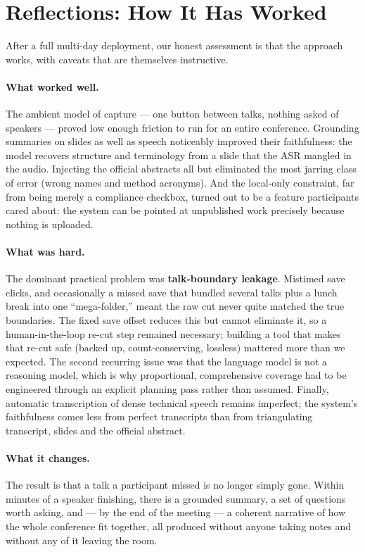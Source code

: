 \documentclass[11pt]{article}
\begin{document}
\section{Reflections: How It Has Worked}
After a full multi-day deployment, our honest assessment is that the approach
works, with caveats that are themselves instructive.

\paragraph{What worked well.}
The ambient model of capture --- one button between talks, nothing asked of
speakers --- proved low enough friction to run for an entire conference. Grounding
summaries on slides as well as speech noticeably improved their faithfulness: the
model recovers structure and terminology from a slide that the ASR mangled in the
audio. Injecting the official abstracts all but eliminated the most jarring
class of error (wrong names and method acronyms). And the local-only constraint,
far from being merely a compliance checkbox, turned out to be a feature
participants cared about: the system can be pointed at unpublished work precisely
because nothing is uploaded.

\paragraph{What was hard.}
The dominant practical problem was \textbf{talk-boundary leakage}. Mistimed save
clicks, and occasionally a missed save that bundled several talks plus a lunch
break into one ``mega-folder,'' meant the raw cut never quite matched the true
boundaries. The fixed save offset reduces this but cannot eliminate it, so a
human-in-the-loop re-cut step remained necessary; building a tool that makes that
re-cut safe (backed up, count-conserving, lossless) mattered more than we
expected. The second recurring issue was that the language model is not a
reasoning model, which is why proportional, comprehensive coverage had to be
engineered through an explicit planning pass rather than assumed. Finally,
automatic transcription of dense technical speech remains imperfect; the system's
faithfulness comes less from perfect transcripts than from triangulating
transcript, slides and the official abstract.

\paragraph{What it changes.}
The result is that a talk a participant missed is no longer simply gone. Within
minutes of a speaker finishing, there is a grounded summary, a set of questions
worth asking, and --- by the end of the meeting --- a coherent narrative of how
the whole conference fit together, all produced without anyone taking notes and
without any of it leaving the room.
\end{document}
